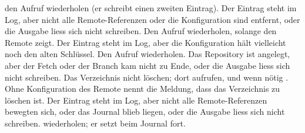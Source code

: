 den Aufruf wiederholen (er schreibt einen zweiten Eintrag). \stopxcell
\stopxrow
\startxrow
\startxcell[width=0.26\textwidth] \dontleavehmode\hbox{} \stopxcell
\startxcell[width=0.35\textwidth] Der Eintrag  steht im Log,
aber nicht alle Remote-Referenzen oder die Konfiguration sind entfernt,
oder die Ausgabe liess sich nicht schreiben. \stopxcell
\startxcell Den Aufruf wiederholen, solange  den Remote zeigt. \stopxcell
\stopxrow
\startxrow
\startxcell[width=0.26\textwidth] \dontleavehmode\hbox{} \stopxcell
\startxcell[width=0.35\textwidth] Der Eintrag  steht im Log,
aber die Konfiguration hält vielleicht noch den alten Schlüssel. \stopxcell
\startxcell Den Aufruf wiederholen. \stopxcell
\stopxrow
\startxrow
\startxcell[width=0.26\textwidth]  \stopxcell
\startxcell[width=0.35\textwidth] Das Repository ist angelegt,
aber der Fetch oder der Branch  kam nicht zu Ende,
oder die Ausgabe liess sich nicht schreiben. \stopxcell
\startxcell Das Verzeichnis nicht löschen; dort  aufrufen,
und wenn nötig .
Ohne Konfiguration des Remote nennt die Meldung, dass das Verzeichnis zu löschen ist. \stopxcell
\stopxrow
\startxrow[bottomframe=on]
\startxcell[width=0.26\textwidth]  \stopxcell
\startxcell[width=0.35\textwidth] Der Eintrag  steht im Log, aber nicht alle
Remote-Referenzen bewegten sich, oder das Journal  blieb liegen,
oder die Ausgabe liess sich nicht schreiben. \stopxcell
\startxcell {} wiederholen; er setzt beim Journal fort. \stopxcell
\stopxrow
\stopxtable
\stopplacetable

